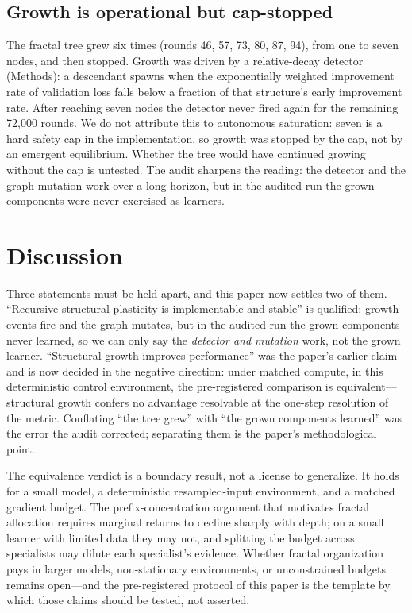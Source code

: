 \documentclass[11pt]{article}
\begin{document}
\subsection{Growth is operational but cap-stopped}\label{sec:growth}

The fractal tree grew six times (rounds 46, 57, 73, 80, 87, 94), from one to seven nodes, and then stopped. Growth was driven by a relative-decay detector (Methods): a descendant spawns when the exponentially weighted improvement rate of validation loss falls below a fraction of that structure's early improvement rate. After reaching seven nodes the detector never fired again for the remaining 72,000 rounds. We do not attribute this to autonomous saturation: seven is a hard safety cap in the implementation, so growth was stopped by the cap, not by an emergent equilibrium. Whether the tree would have continued growing without the cap is untested. The audit sharpens the reading: the detector and the graph mutation work over a long horizon, but in the audited run the grown components were never exercised as learners.

\section{Discussion}

Three statements must be held apart, and this paper now settles two of them. ``Recursive structural plasticity is implementable and stable'' is qualified: growth events fire and the graph mutates, but in the audited run the grown components never learned, so we can only say the \emph{detector and mutation} work, not the grown learner. ``Structural growth improves performance'' was the paper's earlier claim and is now decided in the negative direction: under matched compute, in this deterministic control environment, the pre-registered comparison is equivalent---structural growth confers no advantage resolvable at the one-step resolution of the metric. Conflating ``the tree grew'' with ``the grown components learned'' was the error the audit corrected; separating them is the paper's methodological point.

The equivalence verdict is a boundary result, not a license to generalize. It holds for a small model, a deterministic resampled-input environment, and a matched gradient budget. The prefix-concentration argument that motivates fractal allocation \cite{LmPrincipleFractal} requires marginal returns to decline sharply with depth; on a small learner with limited data they may not, and splitting the budget across specialists may dilute each specialist's evidence. Whether fractal organization pays in larger models, non-stationary environments, or unconstrained budgets remains open---and the pre-registered protocol of this paper is the template by which those claims should be tested, not asserted.
\end{document}
